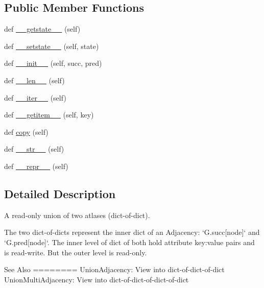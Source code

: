 \subsection*{Public Member Functions}
\begin{DoxyCompactItemize}
\item 
def \hyperlink{classnetworkx_1_1classes_1_1coreviews_1_1UnionAtlas_ab34a344a801ea8b5dbb9cd14cea64b4e}{\+\_\+\+\_\+getstate\+\_\+\+\_\+} (self)
\item 
def \hyperlink{classnetworkx_1_1classes_1_1coreviews_1_1UnionAtlas_a178f56debd429f56bcf9bacdd3bed02e}{\+\_\+\+\_\+setstate\+\_\+\+\_\+} (self, state)
\item 
def \hyperlink{classnetworkx_1_1classes_1_1coreviews_1_1UnionAtlas_ad24244205109697bc6a158d0db5c1047}{\+\_\+\+\_\+init\+\_\+\+\_\+} (self, succ, pred)
\item 
def \hyperlink{classnetworkx_1_1classes_1_1coreviews_1_1UnionAtlas_a32774b2f2762d1f030debb285d994405}{\+\_\+\+\_\+len\+\_\+\+\_\+} (self)
\item 
def \hyperlink{classnetworkx_1_1classes_1_1coreviews_1_1UnionAtlas_a27b60e197787b3f8999b594785f0eff1}{\+\_\+\+\_\+iter\+\_\+\+\_\+} (self)
\item 
def \hyperlink{classnetworkx_1_1classes_1_1coreviews_1_1UnionAtlas_ad30b196748688430dff3cdeada5dfd4d}{\+\_\+\+\_\+getitem\+\_\+\+\_\+} (self, key)
\item 
def \hyperlink{classnetworkx_1_1classes_1_1coreviews_1_1UnionAtlas_a8f4fb4f35352b57990ea798f6fd685fc}{copy} (self)
\item 
def \hyperlink{classnetworkx_1_1classes_1_1coreviews_1_1UnionAtlas_abcc64a6ed12fc003be5d57e6286e29bd}{\+\_\+\+\_\+str\+\_\+\+\_\+} (self)
\item 
def \hyperlink{classnetworkx_1_1classes_1_1coreviews_1_1UnionAtlas_a307d9e25ec501922bc92813d1a30bfe7}{\+\_\+\+\_\+repr\+\_\+\+\_\+} (self)
\end{DoxyCompactItemize}


\subsection{Detailed Description}
\begin{DoxyVerb}A read-only union of two atlases (dict-of-dict).

The two dict-of-dicts represent the inner dict of
an Adjacency:  `G.succ[node]` and `G.pred[node]`.
The inner level of dict of both hold attribute key:value
pairs and is read-write. But the outer level is read-only.

See Also
========
UnionAdjacency: View into dict-of-dict-of-dict
UnionMultiAdjacency: View into dict-of-dict-of-dict-of-dict
\end{DoxyVerb}
 

